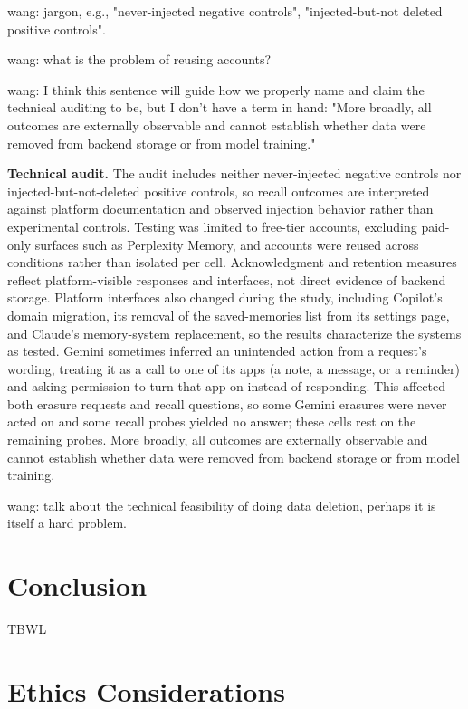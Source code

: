 \documentclass[conference,compsoc]{IEEEtran}
\newcommand{\xw}[1] {{\color{red}wang: #1}}
\begin{document}
\xw{jargon, e.g., "never-injected negative controls", "injected-but-not deleted positive controls".}

\xw{what is the problem of reusing accounts?}

\xw{I think this sentence will guide how we properly name and claim the technical auditing to be, but I don't have a term in hand: "More broadly, all outcomes are externally observable and cannot establish whether data were removed from backend storage or from model training."}

\textbf{Technical audit.} The audit includes neither never-injected negative controls nor injected-but-not-deleted positive controls, so recall outcomes are interpreted against platform documentation and observed injection behavior rather than experimental controls. Testing was limited to free-tier accounts, excluding paid-only surfaces such as Perplexity Memory, and accounts were reused across conditions rather than isolated per cell. Acknowledgment and retention measures reflect platform-visible responses and interfaces, not direct evidence of backend storage. Platform interfaces also changed during the study, including Copilot's domain migration, its removal of the saved-memories list from its settings page, and Claude's memory-system replacement, so the results characterize the systems as tested. Gemini sometimes inferred an unintended action from a request's wording, treating it as a call to one of its apps (a note, a message, or a reminder) and asking permission to turn that app on instead of responding. This affected both erasure requests and recall questions, so some Gemini erasures were never acted on and some recall probes yielded no answer; these cells rest on the remaining probes. More broadly, all outcomes are externally observable and cannot establish whether data were removed from backend storage or from model training.





\xw{talk about the technical feasibility of doing data deletion, perhaps it is itself a hard problem.}

\section{Conclusion}
TBWL

\section*{Ethics Considerations}
\end{document}
